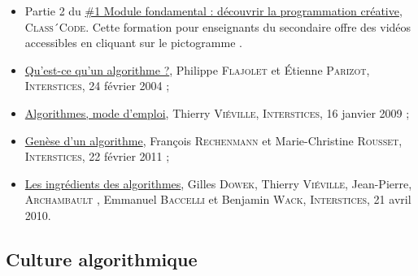 \begin{gofurther}
\begin{itemize}\jazzitem
	\item Partie 2 du \href{https://pixees.fr/classcode/formations/module1/\#partie2}{\#1 Module fondamental : découvrir la programmation créative}, \textsc{Class´Code}. Cette formation pour enseignants du secondaire offre des vidéos accessibles en cliquant sur le pictogramme .
\end{itemize}

\begin{itemize}\jazzitem
\item \href{https://interstices.info/quest-ce-quun-algorithme/}{Qu’est-ce qu’un algorithme ?}, Philippe \textsc{Flajolet} et Étienne \textsc{Parizot}, \textsc{Interstices}, 24 février 2004 ;
\item \href{https://interstices.info/algorithmes-mode-demploi/}{Algorithmes, mode d’emploi}, Thierry \textsc{Viéville}, \textsc{Interstices}, 16 janvier 2009 ;
\item \href{https://interstices.info/genese-dun-algorithme/}{Genèse d’un algorithme}, François \textsc{Rechenmann} et Marie-Chris\-tine \textsc{Rousset}, \textsc{Interstices}, 22 février 2011 ;
\item \href{https://interstices.info/les-ingredients-des-algorithmes/}{Les ingrédients des algorithmes}, Gilles \textsc{Dowek}, Thierry \textsc{Viéville}, Jean-Pierre, \textsc{Archambault} , Emmanuel \textsc{Baccelli} et Benjamin \textsc{Wack}, \textsc{Interstices}, 21 avril 2010.
\end{itemize}
\end{gofurther}


\subsection[Culture algorithmique]{Culture algorithmique}
\label{sub:VI.1.2}

